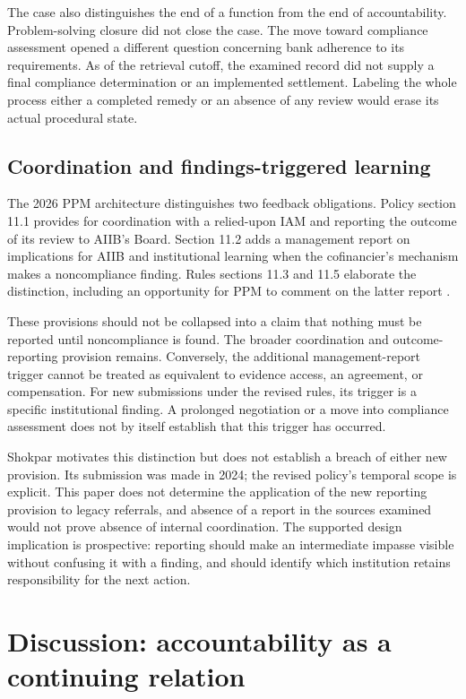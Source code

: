 \documentclass[11pt,a4paper]{article}
\begin{document}
The case also distinguishes the end of a function from the end of accountability. Problem-solving closure did not close the case. The move toward compliance assessment opened a different question concerning bank adherence to its requirements. As of the retrieval cutoff, the examined record did not supply a final compliance determination or an implemented settlement. Labeling the whole process either a completed remedy or an absence of any review would erase its actual procedural state.

\subsection{Coordination and findings-triggered learning}
The 2026 PPM architecture distinguishes two feedback obligations. Policy section 11.1 provides for coordination with a relied-upon IAM and reporting the outcome of its review to AIIB's Board. Section 11.2 adds a management report on implications for AIIB and institutional learning when the cofinancier's mechanism makes a noncompliance finding. Rules sections 11.3 and 11.5 elaborate the distinction, including an opportunity for PPM to comment on the latter report \citep{ppm2026,rules2026}.

These provisions should not be collapsed into a claim that nothing must be reported until noncompliance is found. The broader coordination and outcome-reporting provision remains. Conversely, the additional management-report trigger cannot be treated as equivalent to evidence access, an agreement, or compensation. For new submissions under the revised rules, its trigger is a specific institutional finding. A prolonged negotiation or a move into compliance assessment does not by itself establish that this trigger has occurred.

Shokpar motivates this distinction but does not establish a breach of either new provision. Its submission was made in 2024; the revised policy's temporal scope is explicit. This paper does not determine the application of the new reporting provision to legacy referrals, and absence of a report in the sources examined would not prove absence of internal coordination. The supported design implication is prospective: reporting should make an intermediate impasse visible without confusing it with a finding, and should identify which institution retains responsibility for the next action.

\section{Discussion: accountability as a continuing relation}
\end{document}
